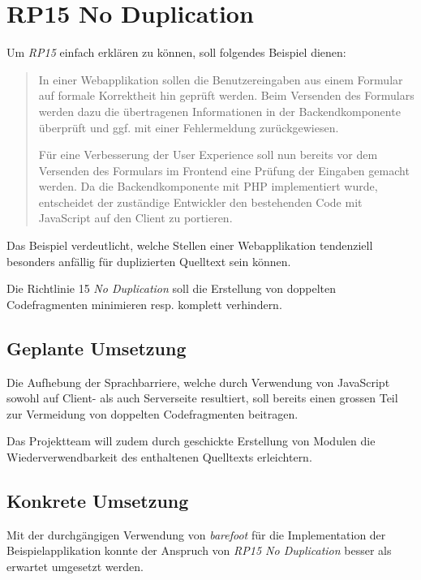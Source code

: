 \section{RP15 No Duplication}
\label{sec:principle-rp15-no-duplication}

Um \emph{RP15} einfach erklären zu können, soll folgendes Beispiel dienen:

\begin{quotation}
In einer Webapplikation sollen die Benutzereingaben aus einem Formular auf formale Korrektheit hin geprüft werden. Beim Versenden des Formulars werden dazu die übertragenen Informationen in der Backendkomponente überprüft und ggf. mit einer Fehlermeldung zurückgewiesen.

Für eine Verbesserung der User Experience soll nun bereits vor dem Versenden des Formulars im Frontend eine Prüfung der Eingaben gemacht werden. Da die Backendkomponente mit PHP implementiert wurde, entscheidet der zuständige Entwickler den bestehenden Code mit JavaScript auf den Client zu portieren.
\end{quotation}

Das Beispiel verdeutlicht, welche Stellen einer Webapplikation tendenziell besonders anfällig für duplizierten Quelltext sein können.

Die Richtlinie 15 \emph{No Duplication} soll die Erstellung von doppelten Codefragmenten minimieren resp. komplett verhindern.


\subsection*{Geplante Umsetzung}

Die Aufhebung der Sprachbarriere, welche durch Verwendung von JavaScript sowohl auf Client- als auch Serverseite resultiert, soll bereits einen grossen Teil zur Vermeidung von doppelten Codefragmenten beitragen.

Das Projektteam will zudem durch geschickte Erstellung von Modulen die Wiederverwendbarkeit des enthaltenen Quelltexts erleichtern.


\subsection*{Konkrete Umsetzung}

Mit der durchgängigen Verwendung von \emph{barefoot} \cite{Barefoot} für die Implementation der Beispielapplikation konnte der Anspruch von \emph{RP15 No Duplication} besser als erwartet umgesetzt werden.

